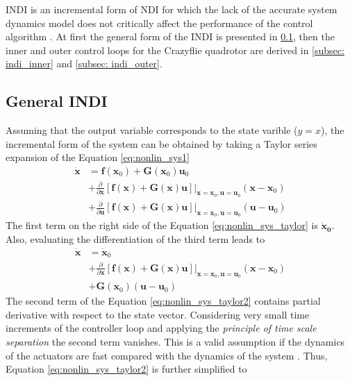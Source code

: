 \documentclass[11pt, a4paper, twoside]{report}
\begin{document}
\acrshort{INDI} is an incremental form of \acrshort{NDI} for which the lack of the accurate system dynamics model does not critically affect the performance of the control algorithm \cite{Silva}. At first the general form of the \acrshort{INDI} is presented in \ref{subsec:indi_general}, then the inner and outer control loops for the Crazyflie quadrotor are derived in \ref{subsec: indi_inner} and \ref{subsec: indi_outer}.

\subsection{General INDI} \label{subsec:indi_general}

Assuming that the output variable corresponds to the state varible ($y=x$), the incremental form of the system can be obtained by taking a Taylor series expansion of the Equation \ref{eq:nonlin_sys1}
\begin{equation}
	\begin{split}
		\bm{\dot{x}} &= \bm{f}(\bm{x}_0) + \bm{G}(\bm{x}_0)\bm{u}_0 \\
		&+ \frac{\partial}{\partial \bm{x}} [\bm{f}(\bm{x}) + \bm{G}(\bm{x})\bm{u}] \bigg|_{\bm{x}=\bm{x}_0,\bm{u}=\bm{u}_0} (\bm{x}-\bm{x}_0) \\
		&+ \frac{\partial}{\partial \bm{u}} [\bm{f}(\bm{x}) + \bm{G}(\bm{x})\bm{u}] \bigg|_{\bm{x}=\bm{x}_0,\bm{u}=\bm{u}_0} (\bm{u}-\bm{u}_0) 
		\label{eq:nonlin_sys_taylor}
	\end{split}
\end{equation}
The first term on the right side of the Equation \ref{eq:nonlin_sys_taylor} is $\bm{\dot{x}_0}$. Also, evaluating the differentiation of the third term leads to 
\begin{equation}
	\begin{split}
		\bm{\dot{x}} &= \bm{\dot{x}}_0 \\ 
		&+ \frac{\partial}{\partial \bm{x}} [\bm{f}(\bm{x}) + \bm{G}(\bm{x})\bm{u}] \bigg|_{\bm{x}=\bm{x}_0,\bm{u}=\bm{u}_0} (\bm{x}-\bm{x}_0) \\
		&+ \bm{G}(\bm{x}_0) (\bm{u}-\bm{u}_0) 
		\label{eq:nonlin_sys_taylor2}
	\end{split}
\end{equation}
The second term of the Equation \ref{eq:nonlin_sys_taylor2} contains partial derivative with respect to the state vector. Considering very small time increments of the controller loop and applying the \textit{principle of time scale separation} the second term vanishes. This is a valid assumption if the dynamics of the actuators are fast compared with the dynamics of the system \cite{Silva}. Thus, Equation \ref{eq:nonlin_sys_taylor2} is further simplified to 
\end{document}
